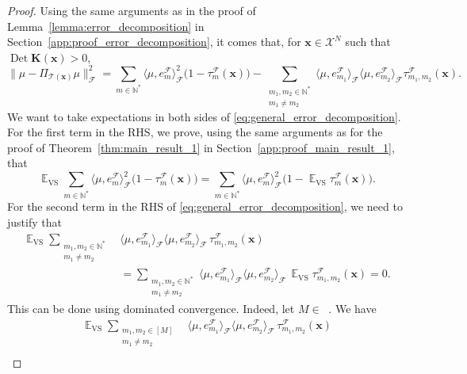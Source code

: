 \documentclass[twoside,11pt]{book}
\DeclareMathOperator{\Det}{Det}
\DeclareMathOperator{\VS}{\mathrm{VS}}
\DeclareMathOperator{\EX}{\mathbb{E}}
\DeclareMathOperator{\F}{\mathcal{F}}
\DeclareMathOperator{\Ns}{\mathbb{N}^{*}}
\begin{document}
\begin{proof}
Using the same arguments as in the proof of Lemma~\ref{lemma:error_decomposition} in Section~\ref{app:proof_error_decomposition}, it comes that,
for $\bm{x} \in \mathcal{X}^{N}$ such that $\Det \bm{K}(\bm{x}) > 0$,
\begin{equation}\label{eq:general_error_decomposition}
\|\mu - \Pi_{\mathcal{T}(\bm{x})} \mu\|_{\F}^{2}  = \sum\limits_{m \in \mathbb{N}^{*}} \langle \mu, e_{m}^{\F} \rangle_{\F}^{2}\bigg(1- \tau_{m}^{\F}(\bm{x})\bigg) - \sum\limits_{\substack{m_{1},m_{2} \in \mathbb{N}^{*} \\ m_{1} \neq m_{2}}}  \langle \mu, e_{m_{1}}^{\F} \rangle_{\F} \langle \mu, e_{m_{2}}^{\F} \rangle_{\F} \tau_{m_{1},m_{2}}^{\F}(\bm{x}).
\end{equation}
We want to take expectations in both sides of \eqref{eq:general_error_decomposition}. For the first term in the RHS, we prove, using the same arguments as for the proof of Theorem~\ref{thm:main_result_1} in Section~\ref{app:proof_main_result_1}, that
\begin{equation}\label{eq:EX_VS_lvs_interpolation}
\EX_{\VS} \sum\limits_{m \in \mathbb{N}^{*}} \langle \mu, e_{m}^{\F} \rangle_{\F}^{2}\bigg(1- \tau_{m}^{\F}(\bm{x})\bigg) = \sum\limits_{m \in \mathbb{N}^{*}} \langle \mu, e_{m}^{\F} \rangle_{\F}^{2}\bigg(1- \EX_{\VS}\tau_{m}^{\F}(\bm{x})\bigg).
\end{equation}
For the second term in the RHS of \eqref{eq:general_error_decomposition}, we need to justify that
\begin{align}
\EX_{\VS} \sum\limits_{\substack{m_{1},m_{2} \in \mathbb{N}^{*} \\ m_{1} \neq m_{2}}}  &\langle \mu, e_{m_{1}}^{\F} \rangle_{\F} \langle \mu, e_{m_{2}}^{\F} \rangle_{\F} \, \tau_{m_{1},m_{2}}^{\F}(\bm{x}) \nonumber\\
& = \sum\limits_{\substack{m_{1},m_{2} \in \mathbb{N}^{*} \\ m_{1} \neq m_{2}}}  \langle \mu, e_{m_{1}}^{\F} \rangle_{\F} \langle \mu, e_{m_{2}}^{\F} \rangle_{\F} \,\EX_{\VS}\tau_{m_{1},m_{2}}^{\F}(\bm{x}) = 0.
\label{eq:EX_VS_cross_lvs_interpolation}
\end{align}
This can be done using dominated convergence. Indeed, let $M \in \Ns$. We have
\begin{align}
\EX_{\VS} \sum\limits_{\substack{m_{1},m_{2} \in [M] \\ m_{1} \neq m_{2}}}  &\langle \mu, e_{m_{1}}^{\F} \rangle_{\F} \langle \mu, e_{m_{2}}^{\F} \rangle_{\F} \,\tau_{m_{1},m_{2}}^{\F}(\bm{x}) \nonumber\\

\end{align}
\end{proof}
\end{document}
